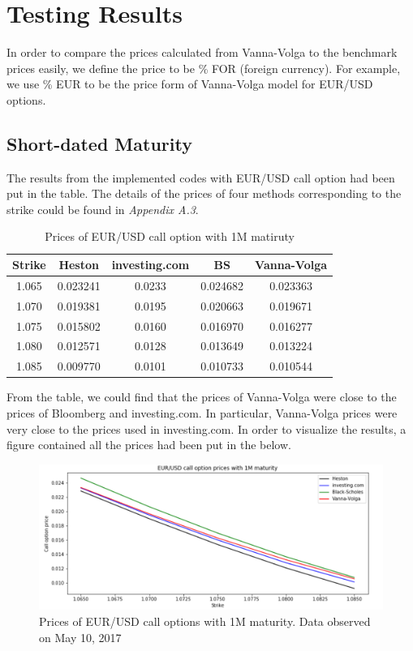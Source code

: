 \section{Testing Results}
In order to compare the prices calculated from Vanna-Volga to the benchmark prices easily, we define the price to be \% FOR (foreign currency). For example, we use \% EUR to be the price form of Vanna-Volga model for EUR/USD options.
\subsection{Short-dated Maturity}
The results from the implemented codes with EUR/USD call option had been put in the table. The details of the prices of four methods corresponding to the strike could be found in \textit{Appendix A.3}.

\begin{table}[htb]
\centering
\caption{Prices of EUR/USD call option with 1M matiruty}
\begin{tabular}{ccccc}
\hline \hline
Strike & Heston & investing.com & BS & Vanna-Volga \\ [0.5ex]
\hline
1.065 &	0.023241&	0.0233	&0.024682&	0.023363 \\ 
1.070&	0.019381&	0.0195&	0.020663&	0.019671\\
1.075	&0.015802&	0.0160&	0.016970&	0.016277 \\
1.080	&0.012571&	0.0128&	0.013649&	0.013224\\
1.085	&0.009770&	0.0101&	0.010733&	0.010544 \\ [0.5ex]
\hline
\end{tabular}
\label{table:prices-1M}
\end{table}

\noindent
From the table, we could find that the prices of Vanna-Volga were close to the prices of Bloomberg and investing.com. In particular, Vanna-Volga prices were very close to the prices used in investing.com. In order to visualize the results, a figure contained all the prices had been put in the below.

\begin{figure}[htb]
	\centering
\includegraphics[scale=0.4]{./Testing-data/Python-codes/Python-4prices-1M.png} 
\caption{Prices of EUR/USD call options with 1M maturity. Data observed on May 10, 2017}
\label{fig:prices-label} %
\end{figure}

